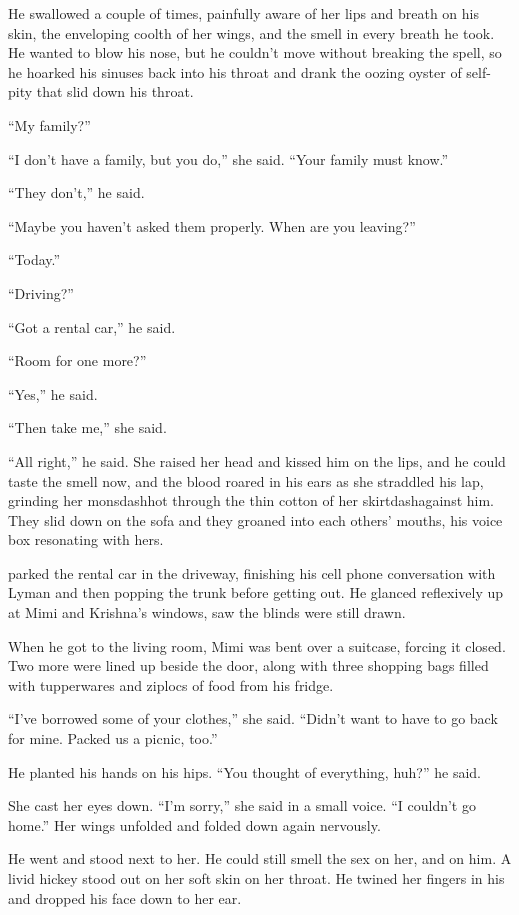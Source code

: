 He swallowed a couple of times, painfully aware of her lips and breath
on his skin, the enveloping coolth of her wings, and the smell in
every breath he took.  He wanted to blow his nose, but he couldn't
move without breaking the spell, so he hoarked his sinuses back into
his throat and drank the oozing oyster of self-pity that slid down his
throat.

``My family?''

``I don't have a family, but you do,'' she said.  ``Your family must
know.''

``They don't,'' he said.

``Maybe you haven't asked them properly.  When are you leaving?''

``Today.''

``Driving?''

``Got a rental car,'' he said.

``Room for one more?''

``Yes,'' he said.

``Then take me,'' she said.

``All right,'' he said.  She raised her head and kissed him on the
lips, and he could taste the smell now, and the blood roared in his
ears as she straddled his lap, grinding her monsdash{}hot through the
thin cotton of her skirtdash{}against him.  They slid down on the sofa
and they groaned into each others' mouths, his voice box resonating
with hers.

 parked the rental car in the driveway, finishing his cell phone
conversation with Lyman and then popping the trunk before getting out. 
He glanced reflexively up at Mimi and Krishna's windows, saw the
blinds were still drawn.

When he got to the living room, Mimi was bent over a suitcase, forcing
it closed.  Two more were lined up beside the door, along with three
shopping bags filled with tupperwares and ziplocs of food from his
fridge.

``I've borrowed some of your clothes,'' she said.  ``Didn't want to
have to go back for mine.  Packed us a picnic, too.''

He planted his hands on his hips.  ``You thought of everything, huh?''
he said.

She cast her eyes down.  ``I'm sorry,'' she said in a small voice. 
``I couldn't go home.'' Her wings unfolded and folded down again
nervously.

He went and stood next to her.  He could still smell the sex on her,
and on him.  A livid hickey stood out on her soft skin on her throat. 
He twined her fingers in his and dropped his face down to her ear.

